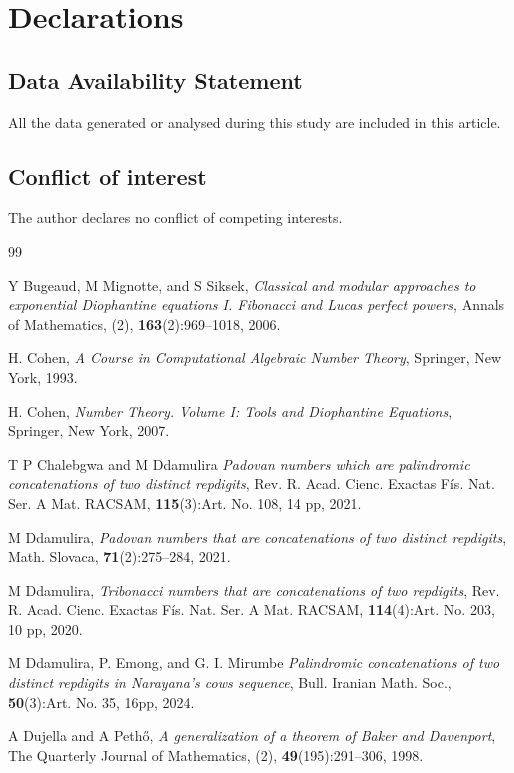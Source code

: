 \documentclass[10pt,a4paper]{article}
\begin{document}
\section*{Declarations}
\subsection*{Data Availability Statement}
All the data generated or analysed during this study are included in this article.

\subsection*{Conflict of interest} The author declares no conflict of competing interests. 

\begin{thebibliography}{99}

Y Bugeaud, M Mignotte, and S Siksek,
\textit{Classical and modular approaches to exponential Diophantine equations I. Fibonacci and Lucas perfect powers},
Annals of Mathematics, (2), {\bf 163}(2):969--1018, 2006.

H. Cohen, {\it A Course in Computational Algebraic Number Theory}, Springer, New York, 1993.

H. Cohen, {\it Number Theory. Volume I: Tools and Diophantine Equations}, Springer, New York, 2007.


T P Chalebgwa and M Ddamulira
\textit{Padovan numbers which are palindromic concatenations of two distinct repdigits}, Rev. R. Acad. Cienc. Exactas F\'is. Nat. Ser. A Mat. RACSAM, {\bf 115}(3):Art. No. 108, 14 pp, 2021.


M Ddamulira,
\textit{Padovan numbers that are concatenations of two distinct repdigits}, Math. Slovaca, {\bf 71}(2):275--284, 2021.

M Ddamulira,
\textit{Tribonacci numbers that are concatenations of two repdigits},
Rev. R. Acad. Cienc. Exactas F\'is. Nat. Ser. A Mat. RACSAM, {\bf 114}(4):Art. No. 203, 10 pp, 2020.

M Ddamulira, P. Emong, and G. I. Mirumbe
\textit{Palindromic concatenations of two distinct repdigits in Narayana's cows sequence}, Bull. Iranian Math. Soc., {\bf 50}(3):Art. No. 35, 16pp, 2024.




A Dujella and A Peth\H{o},
\textit{A generalization of a theorem of Baker and Davenport}, The
Quarterly Journal of Mathematics, (2), {\bf 49}(195):291--306, 1998.


\end{thebibliography}
\end{document}
